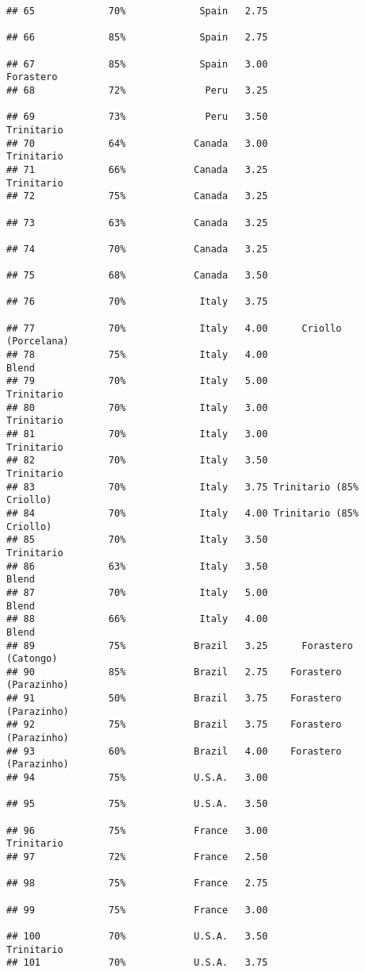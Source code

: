 \documentclass[
]{article}
\begin{document}
\begin{verbatim}
## 65             70%             Spain   2.75                         
## 66             85%             Spain   2.75                         
## 67             85%             Spain   3.00                Forastero
## 68             72%              Peru   3.25                         
## 69             73%              Peru   3.50               Trinitario
## 70             64%            Canada   3.00               Trinitario
## 71             66%            Canada   3.25               Trinitario
## 72             75%            Canada   3.25                         
## 73             63%            Canada   3.25                         
## 74             70%            Canada   3.25                         
## 75             68%            Canada   3.50                         
## 76             70%             Italy   3.75                         
## 77             70%             Italy   4.00      Criollo (Porcelana)
## 78             75%             Italy   4.00                    Blend
## 79             70%             Italy   5.00               Trinitario
## 80             70%             Italy   3.00               Trinitario
## 81             70%             Italy   3.00               Trinitario
## 82             70%             Italy   3.50               Trinitario
## 83             70%             Italy   3.75 Trinitario (85% Criollo)
## 84             70%             Italy   4.00 Trinitario (85% Criollo)
## 85             70%             Italy   3.50               Trinitario
## 86             63%             Italy   3.50                    Blend
## 87             70%             Italy   5.00                    Blend
## 88             66%             Italy   4.00                    Blend
## 89             75%            Brazil   3.25      Forastero (Catongo)
## 90             85%            Brazil   2.75    Forastero (Parazinho)
## 91             50%            Brazil   3.75    Forastero (Parazinho)
## 92             75%            Brazil   3.75    Forastero (Parazinho)
## 93             60%            Brazil   4.00    Forastero (Parazinho)
## 94             75%            U.S.A.   3.00                         
## 95             75%            U.S.A.   3.50                         
## 96             75%            France   3.00               Trinitario
## 97             72%            France   2.50                         
## 98             75%            France   2.75                         
## 99             75%            France   3.00                         
## 100            70%            U.S.A.   3.50               Trinitario
## 101            70%            U.S.A.   3.75                         

\end{verbatim}
\end{document}

